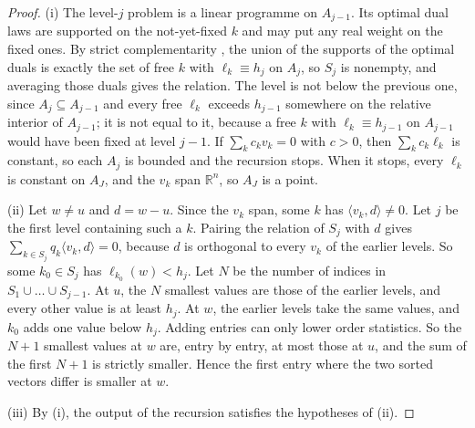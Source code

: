 \documentclass[11pt]{article}
\theoremstyle{definition}\newtheorem{definition}[theorem]{Definition}\newtheorem{remark}[theorem]{Remark}\newtheorem{example}[theorem]{Example}\newtheorem{problem}[theorem]{Open problem}\crefname{problem}{Problem}{Problems}
\newcommand{\R}{\mathbb R}
\begin{document}
\begin{proof}
(i) The level-$j$ problem is a linear programme on $A_{j-1}$. Its optimal dual laws are supported on the not-yet-fixed $k$ and may put any real weight on the fixed ones. By strict complementarity \cite{Schrijver1986}, the union of the supports of the optimal duals is exactly the set of free $k$ with $\ell_k\equiv h_j$ on $A_j$, so $S_j$ is nonempty, and averaging those duals gives the relation. The level is not below the previous one, since $A_j\subseteq A_{j-1}$ and every free $\ell_k$ exceeds $h_{j-1}$ somewhere on the relative interior of $A_{j-1}$; it is not equal to it, because a free $k$ with $\ell_k\equiv h_{j-1}$ on $A_{j-1}$ would have been fixed at level $j-1$. If $\sum_kc_kv_k=0$ with $c>0$, then $\sum_kc_k\ell_k$ is constant, so each $A_j$ is bounded and the recursion stops. When it stops, every $\ell_k$ is constant on $A_J$, and the $v_k$ span $\R^n$, so $A_J$ is a point.

(ii) Let $w\ne u$ and $d=w-u$. Since the $v_k$ span, some $k$ has $\langle v_k,d\rangle\ne0$. Let $j$ be the first level containing such a $k$. Pairing the relation of $S_j$ with $d$ gives $\sum_{k\in S_j}q_k\langle v_k,d\rangle=0$, because $d$ is orthogonal to every $v_k$ of the earlier levels. So some $k_0\in S_j$ has $\ell_{k_0}(w)<h_j$. Let $N$ be the number of indices in $S_1\cup\dots\cup S_{j-1}$. At $u$, the $N$ smallest values are those of the earlier levels, and every other value is at least $h_j$. At $w$, the earlier levels take the same values, and $k_0$ adds one value below $h_j$. Adding entries can only lower order statistics. So the $N+1$ smallest values at $w$ are, entry by entry, at most those at $u$, and the sum of the first $N+1$ is strictly smaller. Hence the first entry where the two sorted vectors differ is smaller at $w$.

(iii) By (i), the output of the recursion satisfies the hypotheses of (ii).
\end{proof}
\end{document}
